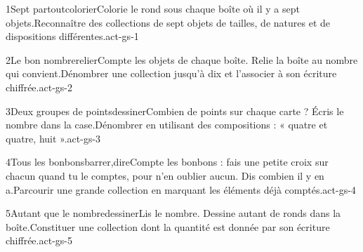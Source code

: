 \begin{activite}{1}{Sept partout}{colorier}{Colorie le rond sous chaque boîte où il y a {\otBold\color{otNavy}sept} objets.}{Reconnaître des collections de sept objets de tailles, de natures et de dispositions différentes.}{act-gs-1}
\end{activite}
\begin{activite}{2}{Le bon nombre}{relier}{Compte les objets de chaque boîte. Relie la boîte au {\otBold\color{otNavy}nombre} qui convient.}{Dénombrer une collection jusqu’à dix et l’associer à son écriture chiffrée.}{act-gs-2}
\end{activite}
\begin{activite}{3}{Deux groupes de points}{dessiner}{Combien de points sur chaque carte ? {\otBold\color{otNavy}Écris} le nombre dans la case.}{Dénombrer en utilisant des compositions : « quatre et quatre, huit ».}{act-gs-3}
\end{activite}
\begin{activite}{4}{Tous les bonbons}{barrer,dire}{Compte les bonbons : fais une petite croix sur chacun quand tu le comptes, pour n’en oublier aucun. Dis combien il y en a.}{Parcourir une grande collection en marquant les éléments déjà comptés.}{act-gs-4}
\end{activite}
\begin{activite}{5}{Autant que le nombre}{dessiner}{Lis le nombre. Dessine {\otBold\color{otNavy}autant} de ronds dans la boîte.}{Constituer une collection dont la quantité est donnée par son écriture chiffrée.}{act-gs-5}
\end{activite}
